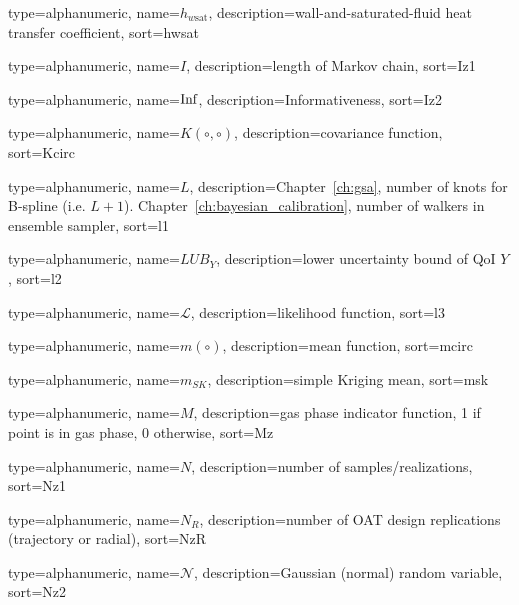 {
  type=alphanumeric,
	name={\ensuremath{h_{w\text{sat}}}},
	description={wall-and-saturated-fluid heat transfer coefficient},
	sort={hwsat}
}

{
  type=alphanumeric,
	name={\ensuremath{I}},
	description={length of Markov chain},
	sort={Iz1}
}

{
  type=alphanumeric,
	name={\ensuremath{\textnormal{Inf}}},
	description={Informativeness},
	sort={Iz2}
}

{
  type=alphanumeric,
	name={\ensuremath{K (\circ, \circ)}},
	description={covariance function},
	sort={Kcirc}
}

{
  type=alphanumeric,
	name={\ensuremath{L}},
	description={Chapter~\ref{ch:gsa}, number of knots for B-spline (i.e. $L+1$). \newline Chapter~\ref{ch:bayesian_calibration}, number of walkers in ensemble sampler},
	sort={l1}
}

{
  type=alphanumeric,
	name={\ensuremath{LUB_Y}},
	description={lower uncertainty bound of QoI $Y$},
	sort={l2}
}

{
  type=alphanumeric,
	name={\ensuremath{\mathcal{L}}},
	description={likelihood function},
	sort={l3}
}

{
  type=alphanumeric,
	name={\ensuremath{m (\circ)}},
	description={mean function},
	sort={mcirc}
}

{
  type=alphanumeric,
	name={\ensuremath{m_{SK}}},
	description={simple Kriging mean},
	sort={msk}
}

{
  type=alphanumeric,
	name={\ensuremath{M}},
	description={gas phase indicator function, 1 if point is in gas phase, 0 otherwise},
	sort={Mz}
}

{
  type=alphanumeric,
	name={\ensuremath{N}},
	description={number of samples/realizations},
	sort={Nz1}
}

{
  type=alphanumeric,
	name={\ensuremath{N_R}},
	description={number of OAT design replications (trajectory or radial)},
	sort={NzR}
}

{
  type=alphanumeric,
	name={\ensuremath{\mathcal{N}}},
	description={Gaussian (normal) random variable},
	sort={Nz2}
}

